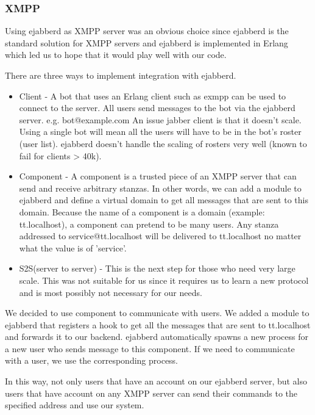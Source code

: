 \documentclass[11pt,a4paper]{report}
\begin{document}
\subsubsection{XMPP}
Using ejabberd as XMPP server was an obvious choice since ejabberd is the
standard solution for XMPP servers and ejabberd is implemented
in Erlang which led us to hope that it would play well with our code.

There are three ways to implement integration with ejabberd.

\begin{itemize}
\item Client - A bot that uses an Erlang client such as exmpp can be used to
connect to the server.
All users send messages to the bot via the ejabberd server. e.g.
bot@example.com
An issue jabber client is that it doesn’t scale. Using a single bot will mean
all the users will have  to be in the bot’s roster (user list).
ejabberd doesn’t handle the scaling of rosters very well
(known to fail for clients > 40k).
\item Component - A component is a trusted piece of an XMPP server that can send and receive arbitrary stanzas. 
In other words, we can add a module to ejabberd and define a virtual domain to
get all messages that are sent to this domain.  
Because the name of a component is a domain (example: tt.localhost), a
component can pretend to be many users. 
Any stanza addressed to service@tt.localhost will be delivered to
tt.localhost no matter what the value is of 'service'.
\item S2S(server to server) - This is the next step for those who need very large scale. This was not suitable for us since it requires us to learn a new
protocol and is most possibly not necessary for our needs.

\end{itemize}

We decided to use component to communicate with users. We added a module to
ejabberd that registers a hook to get all the messages that are sent to
tt.localhost and forwards it to our backend. ejabberd automatically spawns a
new process for a new user who sends message to this component.
If we need to communicate with a user, we use the corresponding process.

In this way, not only users that have an account on our ejabberd server, but
also users that have account on any XMPP server can send their commands to the
specified address and use our system.  
\end{document}
